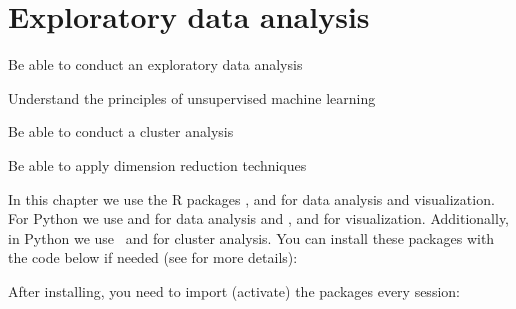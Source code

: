 \chapter{Exploratory data analysis}
\label{chap:eda}

\begin{abstract}{Abstract} This chapter explains how to use data analysis and visualization techniques to understand and communicate the structure and story of our data.  It first introduces the reader to exploratory statistics and data visualization in R and Python. Then, it discusses how unsupervised machine learning, in particular clustering and dimensionality reduction techniques, can be used to group similar cases or to decrease the number of features in a dataset.
\end{abstract}



\begin{objectives}
\item Be able to conduct an exploratory data analysis
\item Understand the principles of unsupervised machine learning
\item Be able to conduct a cluster analysis
\item Be able to apply dimension reduction techniques
\end{objectives}

\newpage
\begin{feature}

In this chapter we use the R packages ,  and  for data analysis and visualization. For Python we use  and  for data analysis and ,  and  for visualization. Additionally, in Python we use \sklearn\ and  for cluster analysis. You can install these packages with the code below if needed  
  (see  for more details):


\noindent After installing, you need to import (activate) the packages every session:


\end{feature}








